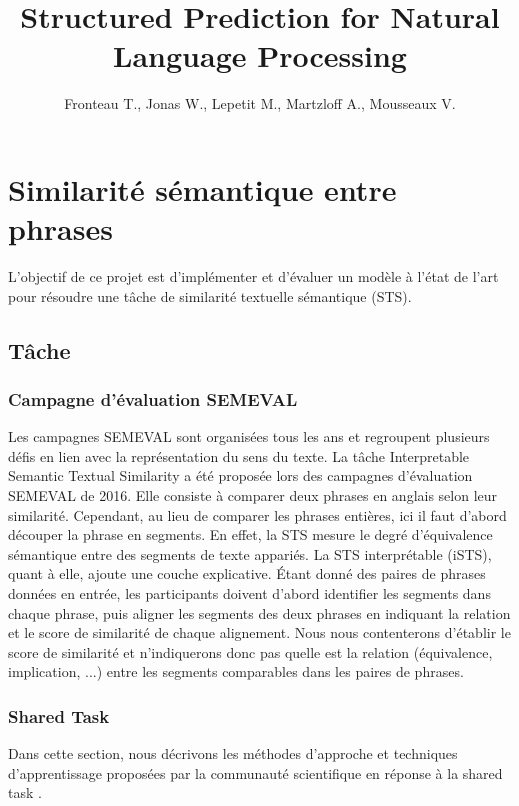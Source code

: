 \documentclass[a4paper, twoside, 11pt]{article}
\title{Structured Prediction for Natural Language Processing}
\author{Fronteau T., Jonas W., Lepetit M., Martzloff A., Mousseaux V.}
\begin{document}
 \maketitle
 \section{Similarité sémantique entre phrases}
    L'objectif de ce projet est d'implémenter et d'évaluer un modèle à l’état de l’art pour résoudre une tâche de similarité textuelle sémantique (STS).

    \subsection{Tâche}

        \subsubsection{Campagne d’évaluation SEMEVAL}

    Les campagnes SEMEVAL sont organisées tous les ans et regroupent plusieurs défis en lien avec la représentation du sens du texte. La tâche Interpretable Semantic Textual Similarity a été proposée lors des campagnes d’évaluation SEMEVAL de 2016. Elle consiste à comparer deux phrases en anglais selon leur similarité. Cependant, au lieu de comparer les phrases entières, ici il faut d’abord découper la phrase en segments. En effet, la STS mesure le degré d'équivalence sémantique entre des segments de texte appariés. La STS interprétable (iSTS), quant à elle, ajoute une couche explicative. Étant donné des paires de phrases données en entrée, les participants doivent d'abord identifier les segments dans chaque phrase, puis aligner les segments des deux phrases en indiquant la relation et le score de similarité de chaque alignement. Nous nous contenterons d'établir le score de similarité et n'indiquerons donc pas quelle est la relation (équivalence, implication, ...) entre les segments comparables dans les paires de phrases.

        \subsubsection{Shared Task}
 Dans cette section, nous décrivons les méthodes d'approche et techniques d'apprentissage proposées par la communauté scientifique en réponse à la \og shared task \fg{}.
\end{document}
